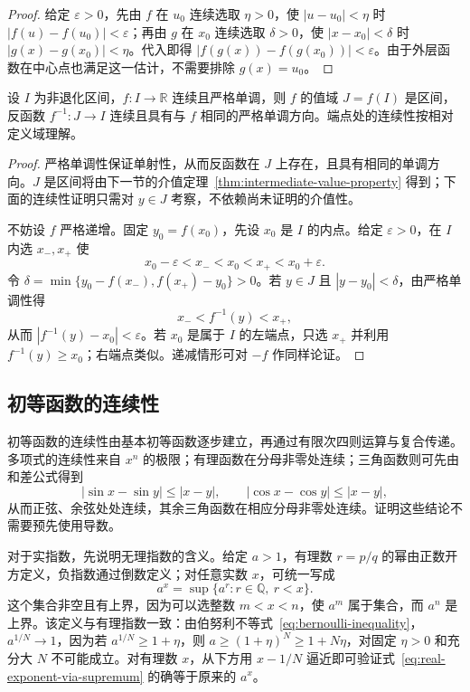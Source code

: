 \documentclass[UTF8,12pt,a4paper,fontset=fandol]{ctexbook}
\begin{document}
\begin{proof}
给定 $\varepsilon>0$，先由 $f$ 在 $u_0$ 连续选取 $\eta>0$，使 $|u-u_0|<\eta$ 时 $|f(u)-f(u_0)|<\varepsilon$；再由 $g$ 在 $x_0$ 连续选取 $\delta>0$，使 $|x-x_0|<\delta$ 时 $|g(x)-g(x_0)|<\eta$。代入即得 $|f(g(x))-f(g(x_0))|<\varepsilon$。由于外层函数在中心点也满足这一估计，不需要排除 $g(x)=u_0$。
\end{proof}

\begin{theorem}[反函数的连续性]
\label{thm:continuity-of-inverse-functions}
设 $I$ 为非退化区间，$f:I\to\mathbb{R}$ 连续且严格单调，则 $f$ 的值域 $J=f(I)$ 是区间，反函数 $f^{-1}:J\to I$ 连续且具有与 $f$ 相同的严格单调方向。端点处的连续性按相对定义域理解。
\end{theorem}

\begin{proof}
严格单调性保证单射性，从而反函数在 $J$ 上存在，且具有相同的单调方向。$J$ 是区间将由下一节的介值定理~\ref{thm:intermediate-value-property} 得到；下面的连续性证明只需对 $y\in J$ 考察，不依赖尚未证明的介值性。

不妨设 $f$ 严格递增。固定 $y_0=f(x_0)$，先设 $x_0$ 是 $I$ 的内点。给定 $\varepsilon>0$，在 $I$ 内选 $x_-,x_+$ 使
\[
    x_0-\varepsilon<x_-<x_0<x_+<x_0+\varepsilon.
\]
令 $\delta=\min\{y_0-f(x_-),f(x_+)-y_0\}>0$。若 $y\in J$ 且 $|y-y_0|<\delta$，由严格单调性得
\[
    x_-<f^{-1}(y)<x_+,
\]
从而 $|f^{-1}(y)-x_0|<\varepsilon$。若 $x_0$ 是属于 $I$ 的左端点，只选 $x_+$ 并利用 $f^{-1}(y)\geq x_0$；右端点类似。递减情形可对 $-f$ 作同样论证。
\end{proof}

\subsection{初等函数的连续性}
\label{subsec:continuity-of-elementary-functions}

初等函数的连续性由基本初等函数逐步建立，再通过有限次四则运算与复合传递。多项式的连续性来自 $x^n$ 的极限；有理函数在分母非零处连续；三角函数则可先由和差公式得到
\[
    |\sin x-\sin y|\leq|x-y|,
    \qquad |\cos x-\cos y|\leq|x-y|,
\]
从而正弦、余弦处处连续，其余三角函数在相应分母非零处连续。证明这些结论不需要预先使用导数。

对于实指数，先说明无理指数的含义。给定 $a>1$，有理数 $r=p/q$ 的幂由正数开方定义，负指数通过倒数定义；对任意实数 $x$，可统一写成
\begin{equation}
    a^x=\sup\{a^r:r\in\mathbb{Q},\ r<x\}.
    \label{eq:real-exponent-via-supremum}
\end{equation}
这个集合非空且有上界，因为可以选整数 $m<x<n$，使 $a^m$ 属于集合，而 $a^n$ 是上界。该定义与有理指数一致：由伯努利不等式~\eqref{eq:bernoulli-inequality}，$a^{1/N}\to1$，因为若 $a^{1/N}\geq1+\eta$，则 $a\geq(1+\eta)^N\geq1+N\eta$，对固定 $\eta>0$ 和充分大 $N$ 不可能成立。对有理数 $x$，从下方用 $x-1/N$ 逼近即可验证式~\eqref{eq:real-exponent-via-supremum} 的确等于原来的 $a^x$。
\end{document}
